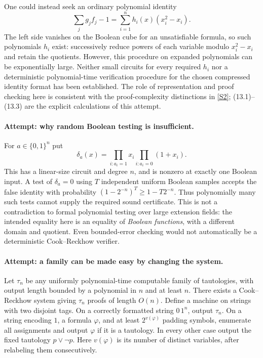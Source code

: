 \documentclass[11pt,a4paper]{article}
\newcommand{\sref}[2]{\hyperlink{source:#1:#2}{[S#2]}}
\begin{document}
One could instead seek an ordinary polynomial identity
\[
 \sum_j g_jf_j-1=\sum_{i=1}^n h_i(x)(x_i^2-x_i). \tag{13.3}
\]
The left side vanishes on the Boolean cube for an unsatisfiable formula,
so such polynomials $h_i$ exist: successively reduce powers of each
variable modulo $x_i^2-x_i$ and retain the quotients. However, this
procedure on expanded polynomials can be exponentially large. Neither
small circuits for every required $h_i$ nor a deterministic polynomial-time
verification procedure for the chosen compressed identity format has
been established. The role of representation and proof checking here
is consistent with the proof-complexity distinctions in \sref{statement}{2};
(13.1)--(13.3) are the explicit calculations of this attempt.

\paragraph{Attempt: why random Boolean testing is insufficient.}
For $a\in\{0,1\}^n$ put
\[
 \delta_a(x)=\prod_{i:a_i=1}x_i\prod_{i:a_i=0}(1+x_i).
\]
This has a linear-size circuit and degree $n$, and is nonzero at exactly
one Boolean input. A test of $\delta_a=0$ using $T$ independent uniform
Boolean samples accepts the false identity with probability
$(1-2^{-n})^T\geq1-T2^{-n}$. Thus polynomially many such tests cannot
supply the required sound certificate. This is not a contradiction to
formal polynomial testing over large extension fields: the intended
equality here is an equality of \emph{Boolean functions}, with a different
domain and quotient. Even bounded-error checking would not automatically
be a deterministic Cook--Reckhow verifier.

\paragraph{Attempt: a family can be made easy by changing the system.}
Let $\tau_n$ be any uniformly polynomial-time computable family of
tautologies, with output length bounded by a polynomial in $n$ and at
least $n$. There exists a Cook--Reckhow system giving $\tau_n$ proofs of
length $O(n)$. Define a machine on strings with two disjoint tags.
On a correctly formatted string $0\,1^n$, output $\tau_n$.
On a string encoding $1$, a formula $\varphi$, and at least
$2^{v(\varphi)}$ padding symbols, enumerate all assignments and output
$\varphi$ if it is a tautology. In every other case output the fixed
tautology $p\lor\neg p$. Here $v(\varphi)$ is its number of distinct
variables, after relabeling them consecutively.
\end{document}
